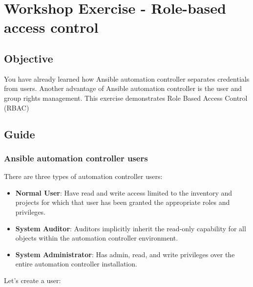 \hypertarget{workshop-exercise---role-based-access-control}{%
\section{Workshop Exercise - Role-based access
control}\label{workshop-exercise---role-based-access-control}}

\hypertarget{objective}{%
\subsection{Objective}\label{objective}}

You have already learned how Ansible automation controller separates
credentials from users. Another advantage of Ansible automation
controller is the user and group rights management. This exercise
demonstrates Role Based Access Control (RBAC)

\hypertarget{guide}{%
\subsection{Guide}\label{guide}}

\hypertarget{ansible-automation-controller-users}{%
\subsubsection{Ansible automation controller
users}\label{ansible-automation-controller-users}}

There are three types of automation controller users:

\begin{itemize}
\item
  \textbf{Normal User}: Have read and write access limited to the
  inventory and projects for which that user has been granted the
  appropriate roles and privileges.
\item
  \textbf{System Auditor}: Auditors implicitly inherit the read-only
  capability for all objects within the automation controller
  environment.
\item
  \textbf{System Administrator}: Has admin, read, and write privileges
  over the entire automation controller installation.
\end{itemize}

Let's create a user:

